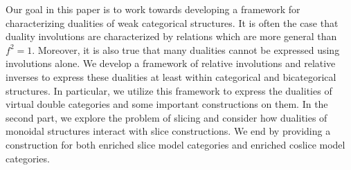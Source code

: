 Our goal in this paper is to work towards developing a framework for characterizing dualities of weak categorical structures. It is often the case that duality involutions are characterized by relations which are more general than $f^2=1$. Moreover, it is also true that many dualities cannot be expressed using involutions alone. We develop a framework of relative involutions and relative inverses to express these dualities at least within categorical and bicategorical structures. In particular, we utilize this framework to express the dualities of virtual double categories and some important constructions on them. In the second part, we explore the problem of slicing and consider how dualities of monoidal structures interact with slice constructions. We end by providing a construction for both enriched slice model categories and enriched coslice model categories. 